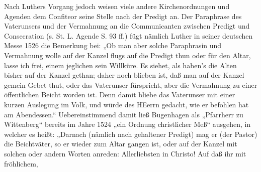 Nach Luthers Vorgang jedoch weisen viele andere Kirchenordnungen und Agenden dem Confiteor seine Stelle nach der Predigt an. Der Paraphrase des Vaterunsers und der Vermahnung an die Communicanten zwischen Predigt und Consecration (s. St. L. Agende S. 93 ff.) fügt nämlich Luther in seiner deutschen Messe 1526 die Bemerkung bei: „Ob man aber solche Paraphrasin und Vermahnung wolle auf der Kanzel flugs auf die Predigt thun oder für den Altar, lasse ich frei, einem jeglichen sein Willküre. Es siehet, als haben’s die Alten bisher auf der Kanzel gethan; daher noch blieben ist, daß man auf der Kanzel gemein Gebet thut, oder das Vaterunser fürspricht, aber die Vermahnung zu einer öffentlichen Beicht worden ist. Denn damit bliebe das Vaterunser mit einer kurzen Auslegung im Volk, und würde des HEerrn gedacht, wie er befohlen hat am Abendessen.“ Uebereinstimmend damit ließ Bugenhagen als „Pfarrherr zu Wittenberg“ bereits im Jahre 1524 „ein Ordnung christlicher Meß“ ausgehen, in welcher es heißt: „Darnach (nämlich nach gehaltener Predigt) mag er (der Pastor) die Beichtväter, so er wieder zum Altar gangen ist, oder auf der Kanzel mit solchen oder andern Worten anreden: Allerliebsten in Christo! Auf daß ihr mit fröhlichem,
